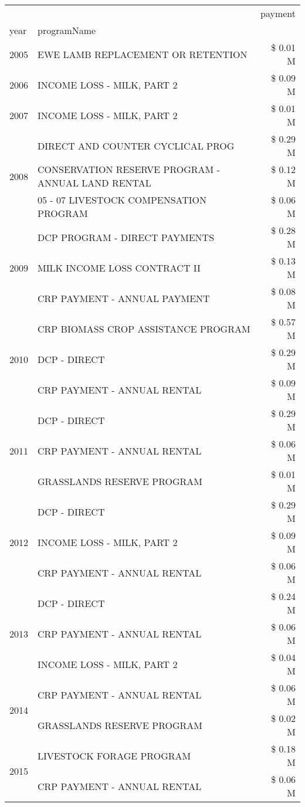 \begin{tabular}{llr}
\toprule
 &  & payment \\
year & programName &  \\
\midrule
2005 & EWE LAMB REPLACEMENT OR RETENTION & \$ 0.01 M \\
\cline{1-3}
2006 & INCOME LOSS - MILK, PART 2 & \$ 0.09 M \\
\cline{1-3}
2007 & INCOME LOSS - MILK, PART 2 & \$ 0.01 M \\
\cline{1-3}
\multirow[t]{3}{*}{2008} & DIRECT AND COUNTER CYCLICAL PROG & \$ 0.29 M \\
 & CONSERVATION RESERVE PROGRAM - ANNUAL LAND RENTAL & \$ 0.12 M \\
 & 05 - 07 LIVESTOCK COMPENSATION PROGRAM & \$ 0.06 M \\
\cline{1-3}
\multirow[t]{3}{*}{2009} & DCP PROGRAM - DIRECT PAYMENTS & \$ 0.28 M \\
 & MILK INCOME LOSS CONTRACT II & \$ 0.13 M \\
 & CRP PAYMENT - ANNUAL PAYMENT & \$ 0.08 M \\
\cline{1-3}
\multirow[t]{3}{*}{2010} & CRP BIOMASS CROP ASSISTANCE PROGRAM & \$ 0.57 M \\
 & DCP - DIRECT & \$ 0.29 M \\
 & CRP PAYMENT - ANNUAL RENTAL & \$ 0.09 M \\
\cline{1-3}
\multirow[t]{3}{*}{2011} & DCP - DIRECT & \$ 0.29 M \\
 & CRP PAYMENT - ANNUAL RENTAL & \$ 0.06 M \\
 & GRASSLANDS RESERVE PROGRAM & \$ 0.01 M \\
\cline{1-3}
\multirow[t]{3}{*}{2012} & DCP - DIRECT & \$ 0.29 M \\
 & INCOME LOSS - MILK, PART 2 & \$ 0.09 M \\
 & CRP PAYMENT - ANNUAL RENTAL & \$ 0.06 M \\
\cline{1-3}
\multirow[t]{3}{*}{2013} & DCP - DIRECT & \$ 0.24 M \\
 & CRP PAYMENT - ANNUAL RENTAL & \$ 0.06 M \\
 & INCOME LOSS - MILK, PART 2 & \$ 0.04 M \\
\cline{1-3}
\multirow[t]{2}{*}{2014} & CRP PAYMENT - ANNUAL RENTAL & \$ 0.06 M \\
 & GRASSLANDS RESERVE PROGRAM & \$ 0.02 M \\
\cline{1-3}
\multirow[t]{3}{*}{2015} & LIVESTOCK FORAGE PROGRAM & \$ 0.18 M \\
 & CRP PAYMENT - ANNUAL RENTAL & \$ 0.06 M \\

\end{tabular}
